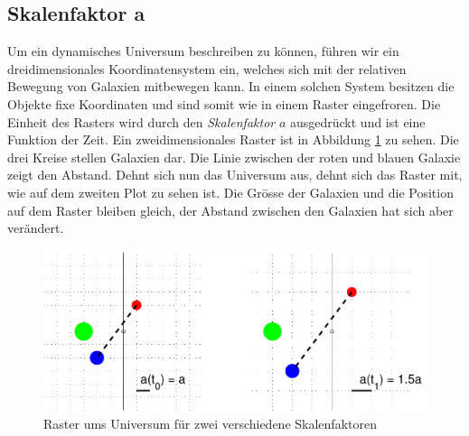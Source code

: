 \begin{refsection}
\section{Skalenfaktor a\label{Section:Skalenfaktor}}
Um ein dynamisches Universum beschreiben zu können, führen wir ein dreidimensionales Koordinatensystem ein, welches sich mit der relativen Bewegung von Galaxien mitbewegen kann. In einem solchen System besitzen die Objekte fixe Koordinaten und sind somit wie in einem Raster eingefroren. Die Einheit des Rasters wird durch den {\em Skalenfaktor} $a$ ausgedrückt und ist eine Funktion der Zeit. Ein zweidimensionales Raster ist in Abbildung \ref{friedmann:friedmannRaster} zu sehen. Die drei Kreise stellen Galaxien dar. Die Linie zwischen der roten und blauen Galaxie zeigt den Abstand. Dehnt sich nun das Universum aus, dehnt sich das Raster mit, wie auf dem zweiten Plot zu sehen ist. Die Grösse der Galaxien und die Position auf dem Raster bleiben gleich, der Abstand zwischen den Galaxien hat sich aber verändert. 

\begin{figure}[h]
	\centering
	\includegraphics[width  = \textwidth]{friedmann/images/rasterFriedmann.pdf}
	\caption{Raster ums Universum für zwei verschiedene Skalenfaktoren}
	\label{friedmann:friedmannRaster}
\end{figure}%

\end{refsection}
